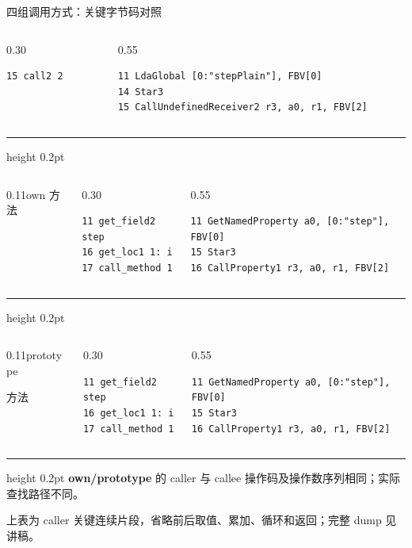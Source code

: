 \documentclass[UTF8,aspectratio=169,10pt,fontset=fandol]{ctexbeamer}
\begin{document}
\begin{frame}[fragile,t]{四组调用方式：关键字节码对照}
\begin{columns}[T,onlytextwidth]
\begin{column}{0.30\textwidth}
\begin{lstlisting}
15 call2 2
\end{lstlisting}
  \end{column}
  \begin{column}{0.55\textwidth}
\begin{lstlisting}
11 LdaGlobal [0:"stepPlain"], FBV[0]
14 Star3
15 CallUndefinedReceiver2 r3, a0, r1, FBV[2]
\end{lstlisting}
  \end{column}
\end{columns}
\par\vspace{3pt}\hrule height 0.2pt\vspace{3pt}
\begin{columns}[T,onlytextwidth]
  \begin{column}{0.11\textwidth}own 方法\end{column}
  \begin{column}{0.30\textwidth}
\begin{lstlisting}
11 get_field2 step
16 get_loc1 1: i
17 call_method 1
\end{lstlisting}
  \end{column}
  \begin{column}{0.55\textwidth}
\begin{lstlisting}
11 GetNamedProperty a0, [0:"step"], FBV[0]
15 Star3
16 CallProperty1 r3, a0, r1, FBV[2]
\end{lstlisting}
  \end{column}
\end{columns}
\par\vspace{3pt}\hrule height 0.2pt\vspace{3pt}
\begin{columns}[T,onlytextwidth]
  \begin{column}{0.11\textwidth}prototype\par 方法\end{column}
  \begin{column}{0.30\textwidth}
\begin{lstlisting}
11 get_field2 step
16 get_loc1 1: i
17 call_method 1
\end{lstlisting}
  \end{column}
  \begin{column}{0.55\textwidth}
\begin{lstlisting}
11 GetNamedProperty a0, [0:"step"], FBV[0]
15 Star3
16 CallProperty1 r3, a0, r1, FBV[2]
\end{lstlisting}
  \end{column}
\end{columns}
\par\vspace{3pt}\hrule height 0.2pt\vspace{4pt}
\fontsize{9}{10.5}\selectfont
\textbf{own/prototype} 的 caller 与 callee 操作码及操作数序列相同；实际查找路径不同。\par
上表为 caller 关键连续片段，省略前后取值、累加、循环和返回；完整 dump 见讲稿。
\endgroup
\end{frame}
\end{document}
